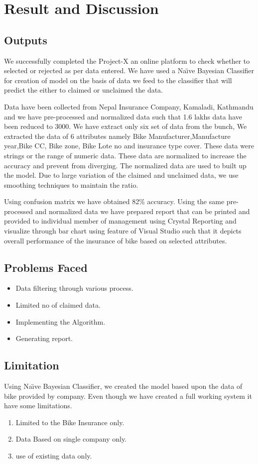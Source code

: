 \chapter{Result and Discussion}
\section{Outputs}
We successfully completed the Project-X an online platform to check whether to selected or rejected as per data entered. We have used a Na\"{\i}ve Bayesian Classifier for creation of model on the basis  of data we feed to the classifier that will predict the either to claimed or unclaimed the data.
\par
Data have been collected from Nepal Insurance Company, Kamaladi, Kathmandu and we have pre-processed and normalized data such that 1.6 lakhs data have been reduced to 3000. We have extract only six set of data from the bunch, We extracted the data of 6 attributes namely Bike Manufacturer,Manufacture year,Bike CC, Bike zone, Bike Lote no and insurance type cover. These data were strings or the range of numeric data. These data are normalized to increase the accuracy and prevent from diverging.
The normalized data are used to built up the  model. Due to large variation of the claimed and unclaimed data, we use smoothing techniques to maintain the ratio.

\par
Using confusion matrix we have obtained 82\% accuracy. Using the same pre-processed and normalized data we have prepared report that can be printed and provided to individual member of management using Crystal Reporting and visualize through bar chart using feature of Visual Studio such that it depicts overall performance of the insurance of bike based on selected attributes.


\newpage
\section{Problems Faced}
\begin{itemize}
\item Data filtering through various process. 
\item Limited no of claimed data.
\item Implementing the Algorithm.
\item Generating report.
\end{itemize}

\section{Limitation}
Using Na\"{\i}ve Bayesian Classifier, we created the model based upon the data of bike provided by company. Even though we have created a full working system it have some limitations.
\begin{enumerate}
\item Limited to the Bike Insurance only.
\item Data Based on single company only.
\item use of existing data only.
\end{enumerate}



